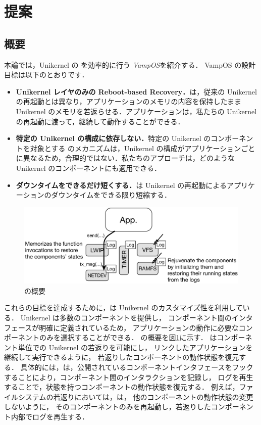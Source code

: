 \section{提案} \label{sec:proposal}

\subsection{概要}

本論では，Unikernel の \rr を効率的に行う \emph{VampOS}を紹介する．
VampOS の設計目標は以下のとおりです．

\begin{itemize}
    \item \textbf{Unikernel レイヤのみの Reboot-based Recovery．}{\sysname は，従来の Unikernel の再起動とは異なり，アプリケーションのメモリの内容を保持したまま Unikernel のメモリを若返らせる．アプリケーションは，私たちの Unikernel の再起動に渡って，継続して動作することができる．}
    \item \textbf{特定の Unikernel の構成に依存しない．}{特定の Unikernel のコンポーネントを対象とする \rr のメカニズムは，Unikernel の構成がアプリケーションごとに異なるため，合理的ではない．私たちのアプローチは，どのような Unikernel のコンポーネントにも適用できる．}
    \item \textbf{ダウンタイムをできるだけ短くする．}{\sysname は Unikernel の再起動によるアプリケーションのダウンタイムをできる限り短縮する．}
\end{itemize}

\begin{figure}[t]
    \begin{center}
      \includegraphics[scale=0.3]{./img/vampos.eps}
      \caption{{\sysname} の概要} 
      \label{fig:overview}
    \end{center}
\end{figure}

これらの目標を達成するために，\sysname は Unikernel のカスタマイズ性を利用している．
Unikernel は多数のコンポーネントを提供し，
コンポーネント間のインタフェースが明確に定義されているため，
アプリケーションの動作に必要なコンポーネントのみを選択することができる．
\sysname の概要を図\ref{fig:overview}に示す．
\sysname はコンポーネント単位での Unikernel の若返りを可能にし，
リンクしたアプリケーションを継続して実行できるように，
若返りしたコンポーネントの動作状態を復元する．
具体的には，\sysname は，公開されているコンポーネントインタフェースをフックすることにより，コンポーネント間のインタラクションを記録し，
ログを再生することで，状態を持つコンポーネントの動作状態を復元する．
例えば，ファイルシステムの若返りにおいては，\sysname は，
他のコンポーネントの動作状態の変更しないように，
そのコンポーネントのみを再起動し，若返りしたコンポーネント内部でログを再生する．

